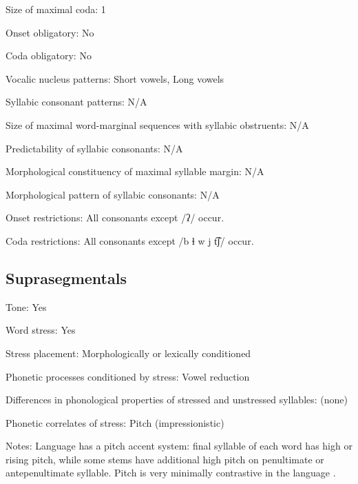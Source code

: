 {\begin{appendixdesc}
\item[Size of maximal coda:] 1

\item[Onset obligatory:] No

\item[Coda obligatory:] No

\item[Vocalic nucleus patterns:] Short vowels, Long vowels

\item[Syllabic consonant patterns:] N/A

\item[Size of maximal word-marginal sequences with syllabic obstruents:] N/A

\item[Predictability of syllabic consonants:] N/A

\item[Morphological constituency of maximal syllable margin:] N/A

\item[Morphological pattern of syllabic consonants:] N/A

\item[Onset restrictions:] All consonants except /ʔ/ occur.

\item[Coda restrictions:] All consonants except /b ɬ w j t͡ʃ/ occur.
\end{appendixdesc}
\subsection*{Suprasegmentals}
\begin{appendixdesc}
\item[Tone:] Yes

\item[Word stress:] Yes

\item[Stress placement:] Morphologically or lexically conditioned

\item[Phonetic processes conditioned by stress:] Vowel reduction

\item[Differences in phonological properties of stressed and unstressed syllables:] (none)

\item[Phonetic correlates of stress:] Pitch (impressionistic)

\item[Notes:] Language has a pitch accent system: final syllable of each word has high or rising pitch, while some stems have additional high pitch on penultimate or antepenultimate syllable. Pitch is very minimally contrastive in the language \citep[17]{Broadwell2006}.
\end{appendixdesc}
}
